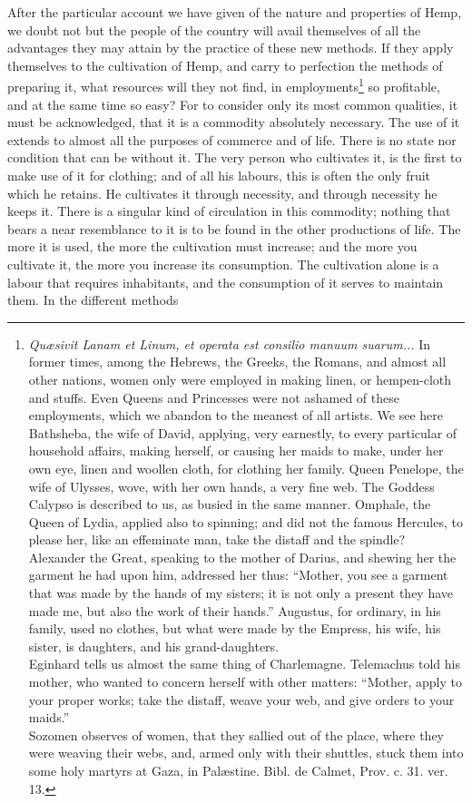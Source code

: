 \documentclass[a4paper, 11pt, oneside, polutonikogreek, english]{article}
\begin{document}
After the particular account we have given of the nature and properties of Hemp, we doubt not but the people of the country will avail themselves of all the advantages they may attain by the practice of these new methods. If they apply themselves to the cultivation of Hemp, and carry to perfection the methods of preparing it, what resources will they not find, in employments\footnote{\emph{Quæsivit Lanam et Linum, et operata est consilio manuum suarum...} In former times, among the Hebrews, the Greeks, the Romans, and almost all other nations, women only were employed in making linen, or hempen-cloth and stuffs. Even Queens and Princesses were not ashamed of these employments, which we abandon to the meanest of all artists. We see here Bathsheba, the wife of David, applying, very earnestly, to every particular of household affairs, making herself, or causing her maids to make, under her own eye, linen and woollen cloth, for clothing her family. Queen Penelope, the wife of Ulysses, wove, with her own hands, a very fine web. The Goddess Calypso is described to us, as busied in the same manner. Omphale, the Queen of Lydia, applied also to spinning; and did not the famous Hercules, to please her, like an effeminate man, take the distaff and the spindle? Alexander the Great, speaking to the mother of Darius, and shewing her the garment he had upon him, addressed her thus: ``Mother, you see a garment that was made by the hands of my sisters; it is not only a present they have made me, but also the work of their hands.'' Augustus, for ordinary, in his family, used no clothes, but what were made by the Empress, his wife, his sister, is daughters, and his grand-daughters.\\\hspace*{5mm}Eginhard tells us almost the same thing of Charlemagne. Telemachus told his mother, who wanted to concern herself with other matters: ``Mother, apply to your proper works; take the distaff, weave your web, and give orders to your maids.''\\\hspace*{5mm}Sozomen observes of women, that they sallied out of the place, where they were weaving their webs, and, armed only with their shuttles, stuck them into some holy martyrs at Gaza, in Palæstine. Bibl. de Calmet, Prov. c. 31. ver. 13.} so profitable, and at the same time so easy? For to consider only its most common qualities, it must be acknowledged, that it is a commodity absolutely necessary. The use of it extends to almost all the purposes of commerce and of life. There is no state nor condition that can be without it. The very person who cultivates it, is the first to make use of it for clothing; and of all his labours, this is often the only fruit which he retains. He cultivates it through necessity, and through necessity he keeps it. There is a singular kind of circulation in this commodity; nothing that bears a near resemblance to it is to be found in the other productions of life. The more it is used, the more the cultivation must increase; and the more you cultivate it, the more you increase its consumption. The cultivation alone is a labour that requires inhabitants, and the consumption of it serves to maintain them. In the different methods 
\end{document}
